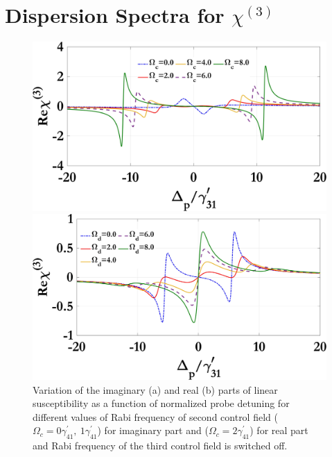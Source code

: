 \documentclass[a4paper,12pt]{article}
\begin{document}
\section{Dispersion Spectra for \(\chi^{(3)}\) }

\begin{figure}[h]
  \centering
  \begin{minipage}{0.48\textwidth}
    \centering
    \includegraphics[width=\linewidth]{Plots/Real_chi3_Omega_c.jpeg}
    \subcaption{}
  \end{minipage}%
  \hfill
  \begin{minipage}{0.48\textwidth}
    \centering
    \includegraphics[width=\linewidth]{Plots/Real_chi3_Omega_d.jpeg}
    \subcaption{}
  \end{minipage}
  \caption{Variation of the imaginary (a) and real (b) parts of linear susceptibility as a function of normalized probe detuning for different values of Rabi frequency of second control field ($\Omega_c=0\gamma^{\prime}_{41},\ 1\gamma^{\prime}_{41}$) for imaginary part and ($\Omega_c=2\gamma^{\prime}_{41}$) for real part and Rabi frequency of the third control field is switched off.}
  \label{fig:chi3_omegad}
\end{figure}
\end{document}
